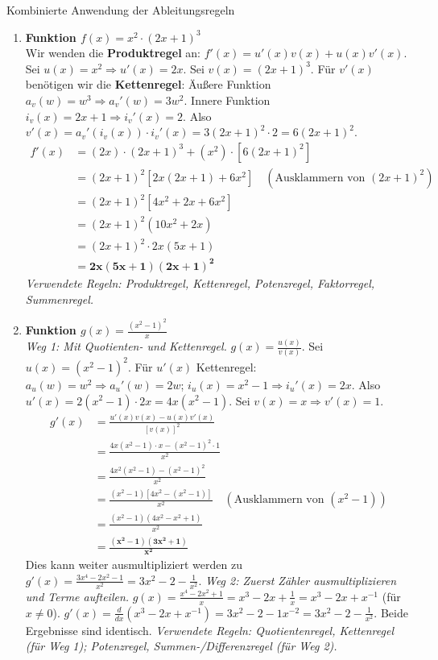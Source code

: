 \begin{loesungsumgebung}{Kombinierte Anwendung der Ableitungsregeln}

\begin{enumerate}[label=(\alph*)]
    \item \textbf{Funktion $f(x) = x^2 \cdot (2x+1)^3$} \\
    Wir wenden die \textbf{Produktregel} an: $f'(x) = u'(x)v(x) + u(x)v'(x)$.
    Sei $u(x) = x^2 \Rightarrow u'(x) = 2x$.
    Sei $v(x) = (2x+1)^3$. Für $v'(x)$ benötigen wir die \textbf{Kettenregel}:
    Äußere Funktion $a_v(w) = w^3 \Rightarrow a_v'(w) = 3w^2$.
    Innere Funktion $i_v(x) = 2x+1 \Rightarrow i_v'(x) = 2$.
    Also $v'(x) = a_v'(i_v(x)) \cdot i_v'(x) = 3(2x+1)^2 \cdot 2 = 6(2x+1)^2$.
    \begin{align*}
    f'(x) &= (2x) \cdot (2x+1)^3 + (x^2) \cdot [6(2x+1)^2] \\
          &= (2x+1)^2 [2x(2x+1) + 6x^2] \quad (\text{Ausklammern von } (2x+1)^2) \\
          &= (2x+1)^2 [4x^2 + 2x + 6x^2] \\
          &= (2x+1)^2 (10x^2 + 2x) \\
          &= (2x+1)^2 \cdot 2x(5x+1) \\
          &= \mathbf{2x(5x+1)(2x+1)^2}
    \end{align*}
    \textit{Verwendete Regeln: Produktregel, Kettenregel, Potenzregel, Faktorregel, Summenregel.}

    \item \textbf{Funktion $g(x) = \frac{(x^2-1)^2}{x}$} \\
    \textit{Weg 1: Mit Quotienten- und Kettenregel.} $g(x) = \frac{u(x)}{v(x)}$.
    Sei $u(x) = (x^2-1)^2$. Für $u'(x)$ Kettenregel: $a_u(w)=w^2 \Rightarrow a_u'(w)=2w$; $i_u(x)=x^2-1 \Rightarrow i_u'(x)=2x$.
    Also $u'(x) = 2(x^2-1) \cdot 2x = 4x(x^2-1)$.
    Sei $v(x) = x \Rightarrow v'(x) = 1$.
    \begin{align*}
    g'(x) &= \frac{u'(x)v(x) - u(x)v'(x)}{[v(x)]^2} \\
          &= \frac{4x(x^2-1) \cdot x - (x^2-1)^2 \cdot 1}{x^2} \\
          &= \frac{4x^2(x^2-1) - (x^2-1)^2}{x^2} \\
          &= \frac{(x^2-1)[4x^2 - (x^2-1)]}{x^2} \quad (\text{Ausklammern von } (x^2-1)) \\
          &= \frac{(x^2-1)(4x^2 - x^2 + 1)}{x^2} \\
          &= \mathbf{\frac{(x^2-1)(3x^2+1)}{x^2}}
    \end{align*}
    Dies kann weiter ausmultipliziert werden zu $g'(x) = \frac{3x^4 - 2x^2 - 1}{x^2} = 3x^2 - 2 - \frac{1}{x^2}$.
    \textit{Weg 2: Zuerst Zähler ausmultiplizieren und Terme aufteilen.}
    $g(x) = \frac{x^4 - 2x^2 + 1}{x} = x^3 - 2x + \frac{1}{x} = x^3 - 2x + x^{-1}$ (für $x \neq 0$).
    $g'(x) = \frac{d}{dx}(x^3 - 2x + x^{-1}) = 3x^2 - 2 - 1x^{-2} = 3x^2 - 2 - \frac{1}{x^2}$.
    Beide Ergebnisse sind identisch.
    \textit{Verwendete Regeln: Quotientenregel, Kettenregel (für Weg 1); Potenzregel, Summen-/Differenzregel (für Weg 2).}


\end{enumerate}
\end{loesungsumgebung}
